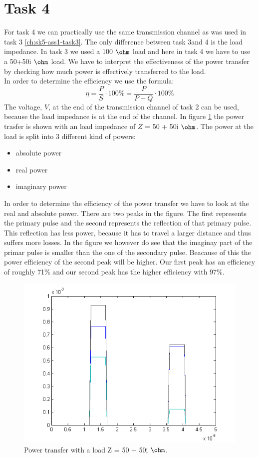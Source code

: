 \documentclass[final]{scrreprt} %
\begin{document}
\label{ch:sk5-ass1-task4}
\section{Task 4}

For task 4 we can practically use the same transmission channel as was used in task 3 \ref{ch:sk5-ass1-task3}. The only difference between task 3and 4 is the load impedance. In task 3 we used a 100 $\ohm$ load and here in task 4 we have to use a 50+50i $\ohm$ load. We have to interpret the effectiveness of the power transfer by checking how much power is effectively transferred to the load.
\\

In order to determine the efficiency we use the formula: 
\begin{equation}
\eta = \frac{P}{S} \cdot 100\% = \frac{P}{P + Q} \cdot 100\%
	\label{eq:efficiency}
\end{equation}
The voltage, $V$, at the end of the transmission channel of task 2 can be used, because the load impedance is at the end of the channel.
In figure \ref{fig:task4} the power trasfer is shown with an load impedance of $Z$ = 50 + 50i $\ohm$. The power at the load is split into 3 different kind of powers:
\begin{itemize}
\item absolute power
\item real power
\item imaginary power
\end{itemize}
In order to determine the efficiency of the power transfer we have to look at the real and absolute power. 
There are two peaks in the figure. The first represents the primary pulse and the second represents the reflection of that primary pulse. This reflection has less power, because it has to travel a larger distance and thus suffers more losses. 
In the figure we however do see that the imaginay part of the primar pulse is smaller than the one of the secondary pulse. Beacause of this the power efficiency of the second peak will be higher. Our first peak has an efficiency of roughly 71\% and our second peak has the higher efficiency with 97\%.

\begin{figure}[H]
\centering
\includegraphics[width=\linewidth]{resources/task4.png}
\caption{Power transfer with a load Z = 50 + 50i $\ohm$.}
\label{fig:task4}
\end{figure}
\end{document}
